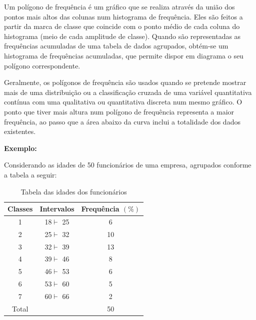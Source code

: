 \documentclass[
	12pt,				%
	oneside,			%
	a4paper,			%
	english,			%
	french,				%
	spanish,			%
	brazil,				%
	]{abntex2}
\begin{document}
Um polígono de frequência é um gráfico que se realiza através da união dos pontos mais altos das
colunas num histograma de frequência. Eles são feitos a partir da marca de classe que coincide com o ponto médio de cada coluna do histograma (meio de cada amplitude de classe). Quando são representadas as
frequências acumuladas de uma tabela de dados agrupados, obtém-se um histograma de frequências
acumuladas, que permite dispor em diagrama o seu polígono correspondente.\cite{poligono}

Geralmente, os polígonos de frequência são usados quando se pretende mostrar mais de uma
distribuição ou a classificação cruzada de uma variável quantitativa contínua com uma qualitativa ou
quantitativa discreta num mesmo gráfico. O ponto que tiver mais altura num polígono de frequência representa a maior frequência, ao passo que a área abaixo da curva inclui a totalidade dos dados existentes. 

\textbf{Exemplo:}

Considerando as idades de 50 funcionários de uma empresa, agrupados conforme a tabela a seguir:

\begin{center}
\begin{table}[H]
\caption{Tabela das idades dos funcionários}
\begin{center}
\begin{tabular}{c|c|c}

\hline
Classes & Intervalos & Frequência $(\%)$ \\ 
\hline
1 & 18$\vdash$ 25 & 6 \\
\hline
2 & 25$\vdash$ 32 & 10 \\
\hline
3 & 32$\vdash$ 39 & 13 \\
\hline
4 & 39$\vdash$ 46 & 8 \\
\hline
5 & 46$\vdash$ 53 & 6 \\
\hline
6 & 53$\vdash$ 60 & 5 \\
\hline
7 & 60$\vdash$ 66 & 2 \\
\hline
Total &  & 50 \\

\end{tabular}
\end{center}
\end{table}
\end{center}
\end{document}
